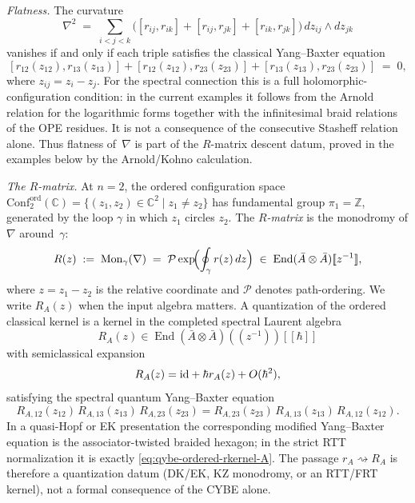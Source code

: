 \begin{construction}
\emph{Flatness.}
The curvature
\[
\nabla^2
\;=\;
\sum_{i<j<k}
\bigl(
[r_{ij},r_{ik}]+[r_{ij},r_{jk}]+[r_{ik},r_{jk}]
\bigr)
\,dz_{ij}\wedge dz_{jk}
\]
vanishes if and only if each triple satisfies the classical
Yang--Baxter equation
\begin{equation}\label{eq:cybe-vol1}
[r_{12}(z_{12}),r_{13}(z_{13})]
+[r_{12}(z_{12}),r_{23}(z_{23})]
+[r_{13}(z_{13}),r_{23}(z_{23})]
\;=\;0,
\end{equation}
where $z_{ij}=z_i-z_j$.
For the spectral connection this is a full holomorphic-configuration
condition: in the current examples it follows from the Arnold relation
for the logarithmic forms together with the infinitesimal braid
relations of the OPE residues. It is not a consequence of the
consecutive Stasheff relation alone. Thus flatness of~$\nabla$ is part
of the $R$-matrix descent datum, proved in the examples below by the
Arnold/Kohno calculation.

\emph{The $R$-matrix.}
At $n=2$, the ordered configuration space
$\mathrm{Conf}_2^{\mathrm{ord}}(\mathbb{C})
=\{(z_1,z_2)\in\mathbb{C}^2\mid z_1\neq z_2\}$
has fundamental group $\pi_1=\mathbb{Z}$, generated by the
loop $\gamma$ in which $z_1$ circles $z_2$.
The \emph{$R$-matrix} is the monodromy of $\nabla$ around~$\gamma$:
\begin{equation}\label{eq:r-matrix-monodromy-vol1}
R(z)
\;:=\;
\operatorname{Mon}_\gamma(\nabla)
\;=\;
\mathcal{P}\exp\!\Bigl(
\oint_\gamma r(z)\,dz
\Bigr)
\;\in\;
\operatorname{End}(\bar A\otimes\bar A)[\![z^{-1}]\!],
\end{equation}
where $z=z_1-z_2$ is the relative coordinate and $\mathcal{P}$ denotes
path-ordering.
We write $R_A(z)$ when the input algebra matters.  A quantization of
the ordered classical kernel is a kernel in the completed spectral
Laurent algebra
\[
R_A(z)\in
\operatorname{End}(\bar A\otimes\bar A)((z^{-1}))[[\hbar]]
\]
with semiclassical expansion
\[
R_A(z)=\mathrm{id}+\hbar r_A(z)+O(\hbar^2),
\]
satisfying the spectral quantum Yang--Baxter equation
\begin{equation}\label{eq:qybe-ordered-rkernel-A}
R_{A,12}(z_{12})\,R_{A,13}(z_{13})\,R_{A,23}(z_{23})
=
R_{A,23}(z_{23})\,R_{A,13}(z_{13})\,R_{A,12}(z_{12}).
\end{equation}
In a quasi-Hopf or EK presentation the corresponding modified
Yang--Baxter equation is the associator-twisted braided hexagon; in
the strict RTT normalization it is exactly
\eqref{eq:qybe-ordered-rkernel-A}.  The passage
$r_A\rightsquigarrow R_A$ is therefore a quantization datum
\textup{(}DK/EK, KZ monodromy, or an RTT/FRT kernel\textup{)}, not a
formal consequence of the CYBE alone.


\end{construction}
